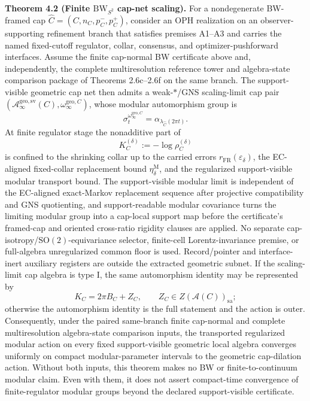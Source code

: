\textbf{Theorem 4.2 (Finite \(\mathrm{BW}_{S^2}\) cap-net scaling).} For a nondegenerate BW-framed cap
\(\widehat C=(C,n_C,p_C^-,p_C^+)\), consider an OPH realization
on an observer-supporting refinement branch that satisfies premises A1--A3 and carries the named
fixed-cutoff regulator, collar, consensus, and optimizer-pushforward interfaces. Assume the finite
cap-normal BW certificate above and, independently, the complete multiresolution reference tower
and algebra-state comparison package of Theorems 2.6c--2.6f on the same branch. The support-visible
geometric cap net then admits a weak-\(*\)/GNS scaling-limit cap pair
\((\mathcal A_\infty^{\mathrm{geo,sv}}(C),\omega_\infty^{\mathrm{geo},C})\), whose modular automorphism
group is
\[
\sigma_t^{\omega_\infty^{\mathrm{geo},C}}
=
\alpha_{\lambda_{\widehat C}(2\pi t)}.
\]
At finite regulator stage the nonadditive part of
\[
K_C^{(\delta)}:=-\log \rho_C^{(\delta)}
\]
is confined to the shrinking collar up to the carried errors \(r_{\mathrm{FR}}(\varepsilon_\delta)\), the EC-aligned fixed-collar replacement bound \(\eta_\delta^{\mathrm M}\), and the regularized support-visible modular transport bound. The support-visible modular limit is independent of the EC-aligned exact-Markov replacement sequence after projective compatibility and GNS quotienting, and support-readable modular covariance turns the limiting modular group into a cap-local support map before the certificate's framed-cap and oriented cross-ratio rigidity clauses are applied. No separate cap-isotropy/\(\mathrm{SO}(2)\)-equivariance selector, finite-cell Lorentz-invariance premise, or full-algebra unregularized common floor is used. Record/pointer and interface-inert auxiliary registers are outside the extracted geometric subnet. If the scaling-limit cap algebra is type I, the same automorphism identity may be represented by
\[
K_C=2\pi B_C+Z_C,\qquad Z_C\in Z(\mathcal A(C))_{\mathrm{sa}};
\]
otherwise the automorphism identity is the full statement and the action is outer. Consequently,
under the paired same-branch finite cap-normal and complete multiresolution algebra-state comparison inputs, the
transported regularized modular action on every fixed support-visible geometric local algebra
converges uniformly on compact modular-parameter intervals to the geometric cap-dilation action.
Without both inputs, this theorem makes no BW or finite-to-continuum modular claim. Even with
them, it does not assert compact-time convergence of finite-regulator modular groups beyond the
declared support-visible certificate.

